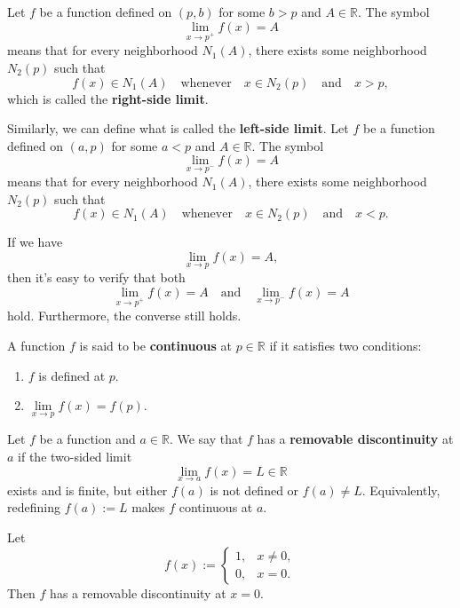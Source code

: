 	\begin{definitionenv}
		Let $f$ be a function defined on $(p,b)$ for some $b>p$ and $A\in \mathbb{R}$. The symbol
		\[
		\lim_{x\to p^+}f(x)=A
		\]
		means that for every neighborhood $N_1(A)$, there exists some neighborhood $N_2(p)$ such that
		\[
		f(x)\in N_1(A)\quad \text{whenever}\quad x\in N_2(p)\quad \text{and}\quad x>p,
		\]
		which is called the \textbf{right-side limit}.
		
		Similarly, we can define what is called the \textbf{left-side limit}.
		Let $f$ be a function defined on $(a,p)$ for some $a<p$ and $A\in \mathbb{R}$. The symbol
		\[
		\lim_{x\to p^-}f(x)=A
		\]
		means that for every neighborhood $N_1(A)$, there exists some neighborhood $N_2(p)$ such that
		\[
		f(x)\in N_1(A)\quad \text{whenever}\quad x\in N_2(p)\quad \text{and}\quad x<p.
		\]
	\end{definitionenv}
	\begin{remarkenv}
		If we have
		\[
		\lim_{x\to p}f(x)=A,
		\]
		then it's easy to verify that both
		\[
		\lim_{x\to p^+}f(x)=A\quad \text{and}\quad \lim_{x\to p^-}f(x)=A
		\]
		hold. Furthermore, the converse still holds.
	\end{remarkenv}
	
	
	\begin{definitionenv}
		A function $f$ is said to be \textbf{continuous} at $p\in \mathbb{R}$ if it satisfies two conditions:
		\begin{enumerate}
			\item $f$ is defined at $p$.
			\item $\lim\limits_{x\to p}f(x)=f(p).$
		\end{enumerate}
	\end{definitionenv}
	
	\begin{definitionenv}
		Let $f$ be a function and $a\in\mathbb{R}$. We say that $f$ has a \textbf{removable discontinuity} at $a$ if the two-sided limit
		\[
		\lim_{x\to a} f(x)=L\in\mathbb{R}
		\]
		exists and is finite, but either $f(a)$ is not defined or $f(a)\neq L$. Equivalently, redefining $f(a):=L$ makes $f$ continuous at $a$.
	\end{definitionenv}
	
	\begin{exampleenv}
		Let
		\[
		f(x):=
		\begin{cases}
			1, & x \neq 0,\\
			0,  & x = 0.
		\end{cases}
		\]
		Then $f$ has a removable discontinuity at $x=0$.
	\end{exampleenv}
	
